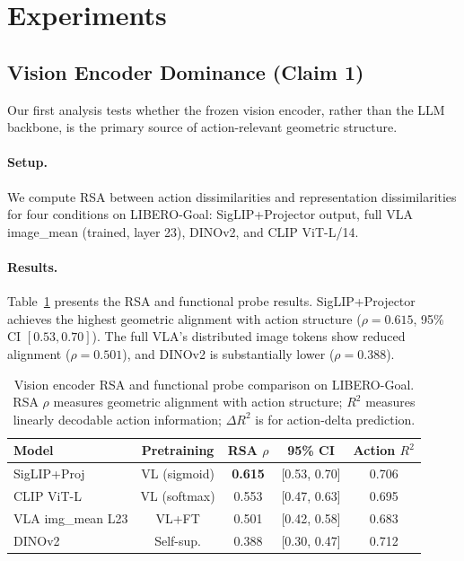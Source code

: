 \documentclass[letterpaper]{article}
\begin{document}
\section{Experiments}
\label{sec:experiments}

\subsection{Vision Encoder Dominance (Claim 1)}
\label{sec:exp-encoder}

Our first analysis tests whether the frozen vision encoder, rather than the LLM backbone, is the primary source of action-relevant geometric structure.

\paragraph{Setup.}
We compute RSA between action dissimilarities and representation dissimilarities for four conditions on LIBERO-Goal: SigLIP+Projector output, full VLA image\_mean (trained, layer 23), DINOv2, and CLIP ViT-L/14.

\paragraph{Results.}
Table~\ref{tab:encoder-rsa} presents the RSA and functional probe results.
SigLIP+Projector achieves the highest geometric alignment with action structure ($\rho{=}0.615$, 95\% CI $[0.53, 0.70]$).
The full VLA's distributed image tokens show reduced alignment ($\rho{=}0.501$), and DINOv2 is substantially lower ($\rho{=}0.388$).

\begin{table}[t]
\centering
\caption{Vision encoder RSA and functional probe comparison on LIBERO-Goal. RSA $\rho$ measures geometric alignment with action structure; $R^2$ measures linearly decodable action information; $\Delta R^2$ is for action-delta prediction.}
\label{tab:encoder-rsa}
\begin{tabular}{@{}lcccc@{}}
\toprule
Model & Pretraining & RSA $\rho$ & 95\% CI & Action $R^2$ \\
\midrule
SigLIP+Proj        & VL (sigmoid)  & \textbf{0.615} & {[0.53, 0.70]} & 0.706 \\
CLIP ViT-L         & VL (softmax)  & 0.553          & {[0.47, 0.63]} & 0.695 \\
VLA img\_mean L23  & VL+FT         & 0.501          & {[0.42, 0.58]} & 0.683 \\
DINOv2             & Self-sup.     & 0.388          & {[0.30, 0.47]} & 0.712 \\
\bottomrule
\end{tabular}
\end{table}
\end{document}
